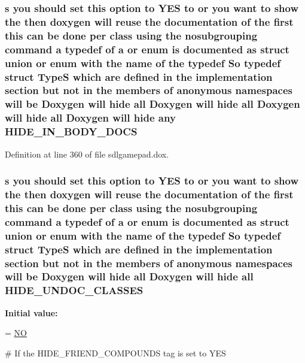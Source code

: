 \hypertarget{sdlgamepad_8dox_aac21372812b1ce4b2d16b5121c56fff6}{
\subsubsection[{H\-I\-D\-E\-\_\-\-I\-N\-\_\-\-B\-O\-D\-Y\-\_\-\-D\-O\-C\-S}]{ {\bf s} you should {\bf set} this option to Y\-E\-S to or you want to show the then doxygen will reuse the documentation of the {\bf first} this can be {\bf done} per class using the nosubgrouping command {\bf a} typedef of {\bf a} or enum is documented as {\bf struct} {\bf union} or enum with the {\bf name} of the typedef So typedef {\bf struct} {\bf Type\-S} which {\bf are} defined {\bf in} the implementation section but {\bf not} {\bf in} the members of anonymous namespaces will be Doxygen will hide all Doxygen will hide all Doxygen will hide all Doxygen will hide any H\-I\-D\-E\-\_\-\-I\-N\-\_\-\-B\-O\-D\-Y\-\_\-\-D\-O\-C\-S}}\label{sdlgamepad_8dox_aac21372812b1ce4b2d16b5121c56fff6}


Definition at line 360 of file sdlgamepad.\-dox.

\hypertarget{sdlgamepad_8dox_a52efc4dfca6b18ed1ee0590d32cbbe76}{
\subsubsection[{H\-I\-D\-E\-\_\-\-U\-N\-D\-O\-C\-\_\-\-C\-L\-A\-S\-S\-E\-S}]{ {\bf s} you should {\bf set} this option to Y\-E\-S to or you want to show the then doxygen will reuse the documentation of the {\bf first} this can be {\bf done} per class using the nosubgrouping command {\bf a} typedef of {\bf a} or enum is documented as {\bf struct} {\bf union} or enum with the {\bf name} of the typedef So typedef {\bf struct} {\bf Type\-S} which {\bf are} defined {\bf in} the implementation section but {\bf not} {\bf in} the members of anonymous namespaces will be Doxygen will hide all Doxygen will hide all H\-I\-D\-E\-\_\-\-U\-N\-D\-O\-C\-\_\-\-C\-L\-A\-S\-S\-E\-S}}\label{sdlgamepad_8dox_a52efc4dfca6b18ed1ee0590d32cbbe76}
{\bfseries Initial value\-:}
\begin{DoxyCode}
= \hyperlink{sdlgamepad_8dox_a0f6a46245280dc38baf9600906aa1393}{NO}

\textcolor{preprocessor}{# If the HIDE\_FRIEND\_COMPOUNDS tag is set to YES}
\end{DoxyCode}


